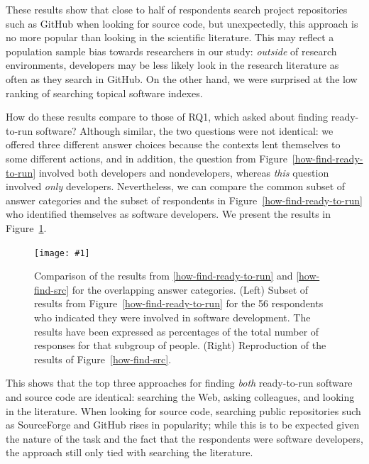 \documentclass[review]{elsarticle}
\newcommand{\totalDevelopers}{56\xspace}
\newcommand{\includefile}[1]{\texttt{[image: \#1]}}
\begin{document}
These results show that close to half of respondents search project repositories such as GitHub when looking for source code, but unexpectedly, this approach is no more popular than looking in the scientific literature.  This may reflect a population sample bias towards researchers in our study: \emph{outside} of research environments, developers may be less likely look in the research literature as often as they search in GitHub.  On the other hand, we were surprised at the low ranking of searching topical software indexes.

How do these results compare to those of RQ1, which asked about finding ready-to-run software?  Although similar, the two questions were not identical: we offered three different answer choices because the contexts lent themselves to some different actions, and in addition, the question from Figure~\ref{how-find-ready-to-run} involved both developers and nondevelopers, whereas \emph{this} question involved \emph{only} developers.  Nevertheless, we can compare the common subset of answer categories and the subset of respondents in Figure~\ref{how-find-ready-to-run} who identified themselves as software developers.  We present the results in Figure~\ref{compare-how-find}.

\begin{figure}[bht]
  \centering
  \includefile{files/plots/compare-how-find-v2.pdf}
  \caption{Comparison of the results from \ref{how-find-ready-to-run} and \ref{how-find-src} for the overlapping answer categories. (Left) Subset of results from Figure~\ref{how-find-ready-to-run} for the \totalDevelopers respondents who indicated they were involved in software development.  The results have been expressed as percentages of the total number of responses for that subgroup of people.  (Right) Reproduction of the results of Figure~\ref{how-find-src}.}
  \label{compare-how-find}
\end{figure}

This shows that the top three approaches for finding \emph{both} ready-to-run software and source code are identical: searching the Web, asking colleagues, and looking in the literature.  When looking for source code, searching public repositories such as SourceForge and GitHub rises in popularity; while this is to be expected given the nature of the task and the fact that the respondents were software developers, the approach still only tied with searching the literature.
\end{document}
